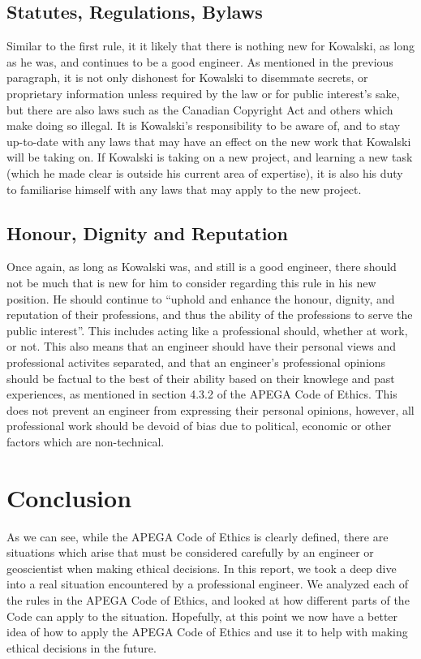 \documentclass[letterpaper,12pt]{article}
\begin{document}
\subsection{Statutes, Regulations, Bylaws}
Similar to the first rule, it it likely that there is nothing new for Kowalski, as long as he was, and continues to be a good engineer.
As mentioned in the previous paragraph, it is not only dishonest for Kowalski to disemmate secrets, or proprietary information unless required
by the law or for public interest's sake, but there are also laws such as the Canadian Copyright Act and others which make doing so illegal. It is
Kowalski's responsibility to be aware of, and to stay up-to-date with any laws that may have an effect on the new work that Kowalski will be taking on.
If Kowalski is taking on a new project, and learning a new task (which he made clear is outside his current area of expertise), it is also his duty to
familiarise himself with any laws that may apply to the new project.

\subsection{Honour, Dignity and Reputation}
Once again, as long as Kowalski was, and still is a good engineer, there should not be much that is new for him to consider regarding this rule
in his new position. He should continue to ``uphold and enhance the honour, dignity,
and reputation of their professions, and thus the ability of the professions to serve the
public interest''\cite{apegacode}. This includes acting like a professional should, whether at work, or not.
This also means that an engineer should have their personal views and professional activites separated, and that an
engineer's professional opinions should be factual to the best of their ability based on their knowlege and past experiences,
as mentioned in section 4.3.2 of the APEGA Code of Ethics\cite{apegacode}. This does not prevent an engineer from expressing their
personal opinions, however, all professional work should be devoid of bias due to political, economic or other factors which are
non-technical.

\section{Conclusion}
As we can see, while the APEGA Code of Ethics is clearly defined, there are situations which arise that must be considered carefully by an engineer or
geoscientist when making ethical decisions. In this report, we took a deep dive into a real situation encountered by a professional engineer.
We analyzed each of the rules in the APEGA Code of Ethics, and looked at how different parts of the Code can apply to the situation.
Hopefully, at this point we now have a better idea of how to apply the APEGA Code of Ethics and use it to help with making
ethical decisions in the future.


\singlespacing
\nocite{*}
\printbibliography
\end{document}
